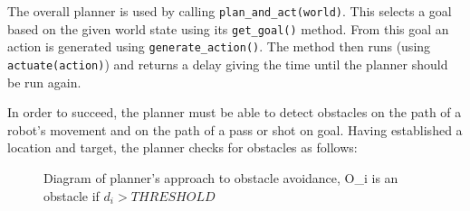 The overall planner is used by calling \texttt{plan\_and\_act(world)}.
This selects a goal based on the given world state  using its \texttt{get\_goal()} method. From this goal an action is generated using \texttt{generate\_action()}. The method then runs (using \texttt{actuate(action)}) and returns a delay giving the time until the planner should be run again.

In order to succeed, the planner must be able to detect obstacles on the path of a robot's movement and on the path of a pass or shot on goal. Having established a location and target, the planner checks for obstacles as follows:

\begin{figure}[H]
\begin{center}
\caption{Diagram of planner's approach to obstacle avoidance, O_i is an obstacle if \(d_i > THRESHOLD\) }
\end{center}
\end{figure}

